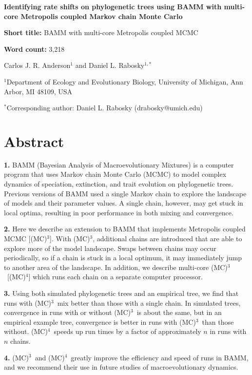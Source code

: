 \documentclass[12pt]{article}
\newcommand{\MCMCMC}{(MC)$^{3}$}
\newcommand{\MCMCMCMC}{(MC)$^{4}$}
\begin{document}
\baselineskip 24pt

\begin{flushleft}

{\Large\textbf{Identifying rate shifts on phylogenetic trees using BAMM
    with multi-core Metropolis coupled Markov chain Monte Carlo}}

\textbf{Short title:} BAMM with multi-core Metropolis coupled MCMC

\textbf{Word count:} 3,218

Carlos J. R. Anderson$^{1}$ and
Daniel L. Rabosky$^{1,*}$

$^{1}$Department of Ecology and Evolutionary Biology,
    University of Michigan, Ann Arbor, MI 48109, USA

$^{*}$Corresponding author: Daniel L. Rabosky (drabosky@umich.edu)

\end{flushleft}


\pagebreak[4]


\section*{Abstract}

{\setlength{\parindent}{0cm}

\textbf{1.}
BAMM (Bayesian Analysis of Macroevolutionary Mixtures) is a computer program
that uses Markov chain Monte Carlo (MCMC) to model complex dynamics
of speciation, extinction, and trait evolution on phylogenetic trees.
%
Previous versions of BAMM used a single Markov chain
to explore the landscape of models and their parameter values.
%
A single chain, however, may get stuck in local optima,
resulting in poor performance in both mixing and convergence.

\textbf{2.}
Here we describe an extension to BAMM
that implements Metropolis coupled MCMC [\MCMCMC].
%
With \MCMCMC, additional chains are introduced
that are able to explore more of the model landscape.
%
Swaps between chains may occur periodically,
so if a chain is stuck in a local optimum,
it may immediately jump to another area of the landscape.
%
In addition, we describe multi-core \MCMCMC\ [\MCMCMCMC]
which runs each chain on a separate computer processor.

\textbf{3.}
Using both simulated phylogenetic trees and an empirical tree,
we find that runs with \MCMCMC\ mix better than those with a single chain.
%
In simulated trees, convergence in runs with or without \MCMCMC\ 
is about the same, but in an empirical example tree,
convergence is better in runs with \MCMCMC\ than those without.
%
\MCMCMCMC\ speeds up run times by a factor of approximately $n$
in runs with $n$ chains.

\textbf{4.}
\MCMCMC\ and \MCMCMCMC\ greatly improve
the efficiency and speed of runs in BAMM,
and we recommend their use in future studies of macroevolutionary dynamics.
}
\end{document}
